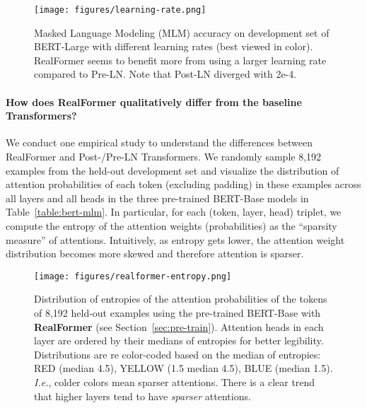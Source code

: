 \documentclass[11pt,a4paper]{article}
\begin{document}
\begin{figure}
\centering
\texttt{[image: figures/learning-rate.png]}
\caption{Masked Language Modeling (MLM) accuracy on development set of BERT-Large with different learning rates (best viewed in color). RealFormer seems to benefit more from using a larger learning rate compared to Pre-LN. Note that Post-LN diverged with 2e-4.}
\label{fig:lr}
\end{figure}



\paragraph{How does RealFormer qualitatively differ from the baseline Transformers?}
We conduct one empirical study to understand the differences between RealFormer and Post-/Pre-LN Transformers. 
We randomly sample 8,192 examples from the held-out development set and visualize the distribution of attention probabilities of each token (excluding padding) in these examples across all layers and all heads in the three pre-trained BERT-Base models in Table~\ref{table:bert-mlm}.
In particular, for each (token, layer, head) triplet, we compute the entropy of the attention weights (probabilities) as the ``sparsity measure'' of attentions. Intuitively, as entropy gets lower, the attention weight distribution becomes more skewed and therefore attention is sparser.

\begin{figure*}[!t]
\centering
\texttt{[image: figures/realformer-entropy.png]}
\caption{Distribution of entropies of the attention probabilities of the tokens of 8,192 held-out examples using the pre-trained BERT-Base with \textbf{RealFormer} (see Section~\ref{sec:pre-train}). Attention heads in each layer are ordered by their medians of entropies for better legibility. Distributions are re color-coded based on the median of entropies: RED (median  4.5), YELLOW (1.5  median  4.5), BLUE (median  1.5). \emph{I.e.}, colder colors mean sparser attentions. There is a clear trend that higher layers tend to have \emph{sparser} attentions.}
\label{fig:realformer-entropy}
\end{figure*}
\end{document}
